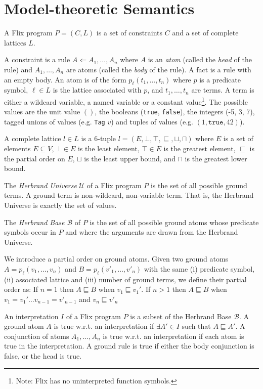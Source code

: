 \documentclass[10pt,twocolumn]{article}
\begin{document}
\section{Model-theoretic Semantics}

A Flix program $P = (C, L)$ is a set of constraints $C$ and a set of complete lattices $L$.

A constraint is a rule $A \Leftarrow A_1, \dots, A_n$ 
where $A$ is an \emph{atom} (called the \emph{head} of the rule) 
and $A_1, \dots, A_n$ are atoms (called the \emph{body} of the rule).
A fact is a rule with an empty body.
An atom is of the form $p_\ell(t_1, \dots, t_n)$ where 
$p$ is a predicate symbol,
$\ell \in L$ is the lattice associated with $p$, and
$t_1, \dots, t_n$ are terms. 
A term is either a wildcard variable, a named variable or a constant value\footnote{Note: Flix has no uninterpreted function symbols.}. 
The possible values are the unit value $()$, the booleans (\texttt{true}, \texttt{false}),
the integers (-5, 3, 7), tagged unions of values (e.g. \texttt{Tag} $v$) and 
tuples of values (e.g. $(1, \texttt{true}, 42)$).

A complete lattice $l \in L$ is a 6-tuple $l = (E, \bot, \top, \sqsubseteq, \sqcup, \sqcap)$ where 
$E$ is a set of elements $E \subseteq V$,
$\bot \in E$ is the least element,
$\top \in E$ is the greatest element,
$\sqsubseteq$ is the partial order on $E$,
$\sqcup$ is the least upper bound, and
$\sqcap$ is the greatest lower bound.

The \emph{Herbrand Universe} $\mathcal{U}$ of a Flix program $P$ is the set of all possible ground terms.
A ground term is non-wildcard, non-variable term. That is, the Herbrand Universe is exactly the set of values.

The \emph{Herbrand Base} $\mathcal{B}$ of $P$ is the set of all possible ground atoms whose
predicate symbols occur in $P$ and where the arguments are drawn from the Herbrand Universe.

We introduce a partial order on ground atoms. 
Given two ground atoms $A = p_\ell(v_1, \dots, v_n)$ and $B = p_\ell(v'_1, \dots, v'_n)$ with the same 
(i) predicate symbol, 
(ii) associated lattice and 
(iii) number of ground terms, we define their partial order as:
If $n = 1$ then $A \sqsubseteq B$ when $v_1 \sqsubseteq v_1'$.
If $n > 1$ then $A \sqsubseteq B$ when $v_1 = v_1' \dots v_{n - 1} = v'_{n - 1}$ and $v_n \sqsubseteq v'_n$

An interpretation $I$ of a Flix program $P$ is a subset of the Herbrand Base $\mathcal{B}$.
A ground atom $A$ is true w.r.t. an interpretation if $\exists A' \in I$ such that $A \sqsubseteq A'$. 
A conjunction of atoms $A_1, \dots, A_n$ is true w.r.t. an interpretation if each atom is true in the interpretation.
A ground rule is true if either the body conjunction is false, or the head is true.
\end{document}
